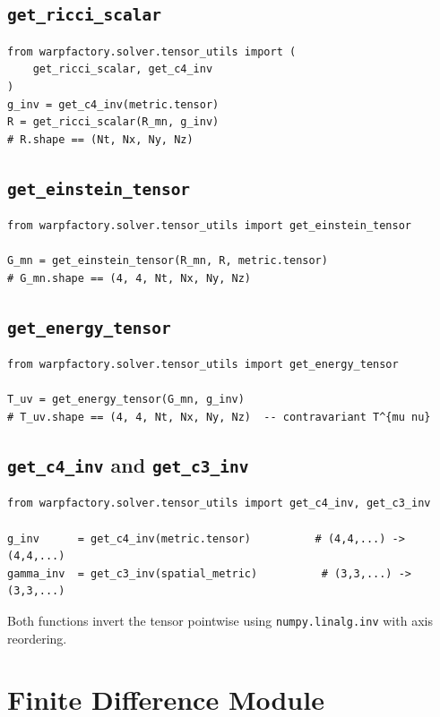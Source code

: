 \documentclass[11pt, a4paper, twoside]{report}
\begin{document}
\subsection{\texttt{get\_ricci\_scalar}}
\begin{lstlisting}
from warpfactory.solver.tensor_utils import (
    get_ricci_scalar, get_c4_inv
)
g_inv = get_c4_inv(metric.tensor)
R = get_ricci_scalar(R_mn, g_inv)
# R.shape == (Nt, Nx, Ny, Nz)
\end{lstlisting}

\subsection{\texttt{get\_einstein\_tensor}}
\begin{lstlisting}
from warpfactory.solver.tensor_utils import get_einstein_tensor

G_mn = get_einstein_tensor(R_mn, R, metric.tensor)
# G_mn.shape == (4, 4, Nt, Nx, Ny, Nz)
\end{lstlisting}

\subsection{\texttt{get\_energy\_tensor}}
\begin{lstlisting}
from warpfactory.solver.tensor_utils import get_energy_tensor

T_uv = get_energy_tensor(G_mn, g_inv)
# T_uv.shape == (4, 4, Nt, Nx, Ny, Nz)  -- contravariant T^{mu nu}
\end{lstlisting}

\subsection{\texttt{get\_c4\_inv} and \texttt{get\_c3\_inv}}
\begin{lstlisting}
from warpfactory.solver.tensor_utils import get_c4_inv, get_c3_inv

g_inv      = get_c4_inv(metric.tensor)          # (4,4,...) -> (4,4,...)
gamma_inv  = get_c3_inv(spatial_metric)          # (3,3,...) -> (3,3,...)
\end{lstlisting}
Both functions invert the tensor pointwise using
\texttt{numpy.linalg.inv} with axis reordering.

\section{Finite Difference Module}
\end{document}
